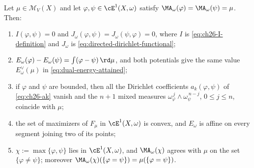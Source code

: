 \begin{proposition}
\label{prop:ch28-solution-set}
Let \(\mu\in\mathcal M_V(X)\) and let
\(\varphi,\psi\in\cE^1(X,\omega)\) satisfy
\(\MA_\omega(\varphi)=\MA_\omega(\psi)=\mu\).  Then:
\begin{enumerate}
\item\label{itm:ch28-sol:I}
 \(I(\varphi,\psi)=0\) and \(J_\omega(\varphi,\psi)=
 J_\omega(\psi,\varphi)=0\), where \(I\) is
 \eqref{eq:ch26-I-definition} and \(J_\omega\) is
 \eqref{eq:directed-dirichlet-functional};
\item\label{itm:ch28-sol:energy}
 \(E_\omega(\varphi)-E_\omega(\psi)=\int(\varphi-\psi)\,\rd\mu\), and both
 potentials give the same value \(E^\vee_\omega(\mu)\) in
 \eqref{eq:dual-energy-attained};
\item\label{itm:ch28-sol:mixed}
 if \(\varphi\) and \(\psi\) are bounded, then all the Dirichlet
 coefficients \(a_k(\varphi,\psi)\) of \eqref{eq:ch26-ak} vanish and the
 \(n+1\) mixed measures
 \(\omega_\varphi^{\,j}\wedge\omega_\psi^{\,n-j}\), \(0\leq j\leq n\),
 coincide with \(\mu\);
\item\label{itm:ch28-sol:convex}
 the set of maximizers of \(F_\mu\) in \(\cE^1(X,\omega)\) is convex, and
 \(E_\omega\) is affine on every segment joining two of its points;
\item\label{itm:ch28-sol:max}
 \(\chi:=\max\{\varphi,\psi\}\) lies in \(\cE^1(X,\omega)\), and
 \(\MA_\omega(\chi)\) agrees with \(\mu\) on the set
 \(\{\varphi\neq\psi\}\); moreover
 \(\MA_\omega(\chi)(\{\varphi=\psi\})=\mu(\{\varphi=\psi\})\).
\end{enumerate}
\end{proposition}

